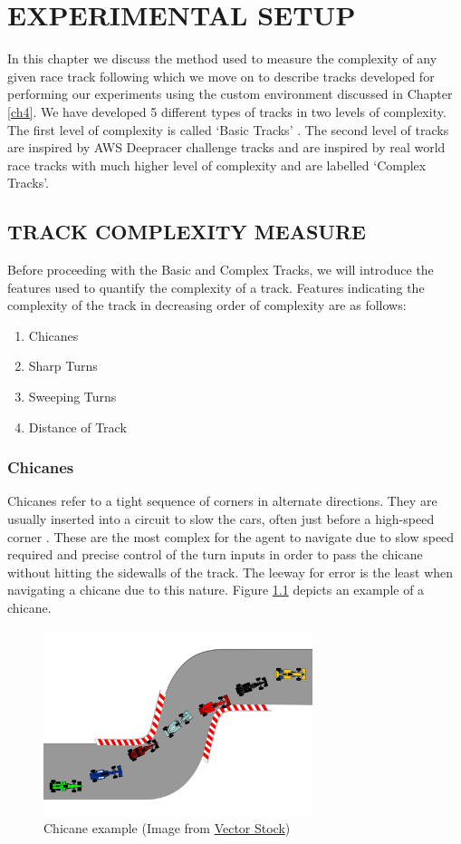 
\chapter{EXPERIMENTAL SETUP} \label{ch5}
In this chapter we discuss the method used to measure the complexity of any given race track following which we move on to describe tracks developed for performing our experiments using the custom environment discussed in Chapter \ref{ch4}. We have developed 5 different types of tracks in two levels of complexity. The first level of complexity is called `Basic Tracks' . The second level of tracks are inspired by AWS Deepracer \cite{deepracer} challenge tracks and are inspired by real world race tracks with much higher level of complexity and are labelled `Complex Tracks'.


\section{TRACK COMPLEXITY MEASURE}
Before proceeding with the Basic and Complex Tracks, we will introduce the features used to quantify the complexity of a track. Features indicating the complexity of the track in decreasing order of complexity are as follows:
\begin{enumerate}
    \item Chicanes
    \item Sharp Turns
    \item Sweeping Turns
    \item Distance of Track
\end{enumerate}
\subsection{Chicanes}
Chicanes refer to a tight sequence of corners in alternate directions. They are usually inserted into a circuit to slow the cars, often just before a high-speed corner \cite{F1Chicane}. These are the most complex for the agent to navigate due to slow speed required and precise control of the turn inputs in order to pass the chicane without hitting the sidewalls of the track. The leeway for error is the least when navigating a chicane due to this nature. Figure \ref{fig:chicane} depicts an example of a chicane.
\begin{figure}[H]
    \centering
    \includegraphics[width=0.7\textwidth]{images/Chicane.jpg}
    \caption{Chicane example (Image from \href{https://www.vectorstock.com/royalty-free-vector/chicane-road-circuit-vector-7128004}{Vector Stock})}
    \label{fig:chicane}
\end{figure}
